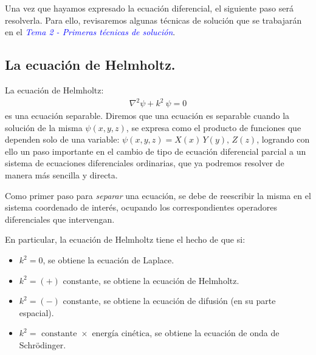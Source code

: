 \documentclass[12pt]{article}
\numberwithin{equation}{section}
\begin{document}
Una vez que hayamos expresado la ecuación diferencial, el siguiente paso será resolverla. Para ello, revisaremos algunas técnicas de solución que se trabajarán en el \emph{\textcolor{blue}{Tema 2 - Primeras técnicas de solución}}.

\subsection{La ecuación de Helmholtz.}

La ecuación de Helmholtz:
\begin{align}
\nabla^{2} \psi + k^{2} \: \psi = 0
\label{eq:ecuacion_02_01}
\end{align}
es una ecuación separable. Diremos que una ecuación es separable cuando la solución de la misma $\psi(x, y, z)$, se expresa como el producto de funciones que dependen solo de una variable: $\psi(x, y, z) = X (x) \, Y (y),\, Z(z)$, logrando con ello un paso importante en el cambio de tipo de ecuación diferencial parcial a un sistema de ecuaciones diferenciales ordinarias, que ya podremos resolver de manera más sencilla y directa. 
\par
Como primer paso para \emph{separar} una ecuación, se debe de reescribir la misma en el sistema coordenado de interés, ocupando los correspondientes operadores diferenciales que intervengan.
\par
En particular, la ecuación de Helmholtz tiene el hecho de que si:
\begin{itemize}
\item $k^{2} = 0$, se obtiene la ecuación de Laplace.
\item $k^{2} = (+) \mbox{ constante}$, se obtiene la ecuación de Helmholtz.
\item $k^{2} = (-) \mbox{ constante}$, se obtiene la ecuación de difusión (en su parte espacial).
\item $k^{2} = \mbox{ constante } \times \mbox{ energía cinética}$, se obtiene la ecuación de onda de Schrödinger.
\end{itemize}
\end{document}
